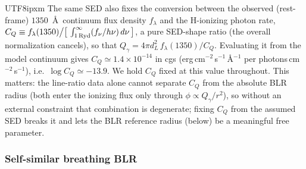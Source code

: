 \documentclass[linenumbers,trackchanges]{aastex701}
\begin{document}
\begin{CJK*}{UTF8}{ipxm}
The same SED also fixes the conversion between the observed (rest-frame) $1350$~\AA\
continuum flux density $f_\lambda$ and the H-ionizing photon rate,
$C_Q \equiv f_\lambda(1350)\big/\big[\,\textstyle\int_{1\,{\rm Ryd}}^{\infty}(f_\nu/h\nu)\,d\nu\,\big]$,
a pure SED-shape ratio (the overall normalization cancels), so that
$Q_\gamma = 4\pi d_L^2\, f_\lambda(1350)/C_Q$.  Evaluating it from the model continuum gives
$C_Q \simeq 1.4\times10^{-14}$ in cgs (erg\,cm$^{-2}$\,s$^{-1}$\,\AA$^{-1}$ per photons\,cm$^{-2}$\,s$^{-1}$),
i.e.\ $\log C_Q \simeq -13.9$.  We hold $C_Q$ fixed at this value throughout.  This matters:
the line-ratio data alone cannot separate $C_Q$ from the absolute BLR radius (both enter the
ionizing flux only through $\phi\propto Q_\gamma/r^2$), so without an external constraint that
combination is degenerate; fixing $C_Q$ from the assumed SED breaks it and lets the BLR
reference radius (below) be a meaningful free parameter.

\subsubsection{Self-similar breathing BLR}


\end{CJK*}
\end{document}
